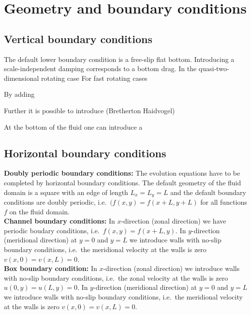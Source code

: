 \section{Geometry and boundary conditions}
%
\subsection{Vertical boundary conditions}
%
The default lower boundary condition is a free-slip flat bottom.
Introducing a scale-independent damping corresponds to a bottom drag.
In the quasi-two-dimensional rotating case For fast rotating cases

By adding 

Further it is possible to introduce  
(Bretherton Haidvogel)

      At the bottom of the fluid one can introduce a 
%
\subsection{Horizontal boundary conditions}
%
{\bf Doubly periodic boundary conditions:} The evolution equations have to be completed by horizontal boundary 
conditions. The default geometry of the fluid domain is a square 
with an edge of length $L_{x} = L_{y} = L$ and the default boundary 
conditions are doubly periodic, i.e.\ $(f(x,y) = f(x+L,y+L)$ for all 
functions $f$ on the fluid domain. \\

\noindent
{\bf Channel boundary conditions:} In $x$-direction (zonal direction) 
we have periodic boudary conditions, i.e.\ $f(x,y) = f(x+L,y)$. 
In $y$-direction (meridional direction) at $y=0$ and $y=L$ we introduce 
walls with no-slip boundary conditions, i.e.\ the meridional velocity at 
the walls is zero $v(x,0) = v(x,L) =  0$. \\

\noindent
{\bf Box boundary condition:} In $x$-direction (zonal direction) 
we introduce walls with no-slip boundary conditions, i.e.\ the zonal 
velocity at the walls is zero $u(0,y) = u(L,y) = 0$. In $y$-direction 
(meridional direction) at $y=0$ and $y=L$ we introduce walls with 
no-slip boundary conditions, i.e.\ the meridional velocity at the walls 
is zero $v(x,0) = v(x,L) =  0$.
